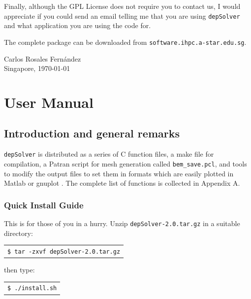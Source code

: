 \documentclass[12pt]{report}
\begin{document}
\noindent Finally, although the GPL License does not require you to contact us, I would appreciate if you could send an email telling me that you are using \verb+depSolver+ and what application you are using the code for.

\noindent The complete package can be downloaded from \verb+software.ihpc.a-star.edu.sg+.

\vspace{1cm}
	Carlos Rosales Fern\'andez\\
	Singapore, \today

\tableofcontents
\pagebreak
\section*{}
\pagebreak

\part{User Manual}

\pagebreak
\section*{}
\pagebreak

\chapter{Introduction and general remarks}
\verb+depSolver+ is distributed as a series of C function files, a make file for compilation, a Patran \cite{patran} script for mesh generation called \verb+bem_save.pcl+, and tools to modify the output files to set them in formats which are easily plotted in Matlab \cite{matlab} or gnuplot \cite{gnuplot}. The complete list of functions is collected in Appendix A.

\section{Quick Install Guide}
This is for those of you in a hurry. Unzip \verb+depSolver-2.0.tar.gz+ in a suitable directory:

\begin{tabular}{l}
\texttt{\$ tar -zxvf depSolver-2.0.tar.gz}
\end{tabular}

then type:

\begin{tabular}{l}
\texttt{\$ ./install.sh}
\end{tabular}
\end{document}
